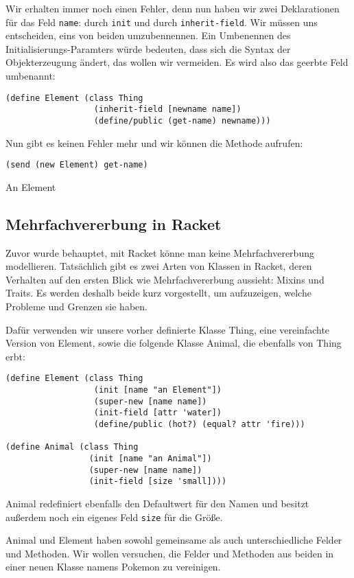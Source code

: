 Wir erhalten immer noch einen Fehler, denn nun haben wir zwei Deklarationen für das Feld \texttt{name}: durch \texttt{init} und durch \texttt{inherit-field}. Wir müssen uns entscheiden, eins von beiden umzubennennen. Ein Umbenennen des Initialisierungs-Paramters würde bedeuten, dass sich die Syntax der Objekterzeugung ändert, das wollen wir vermeiden. Es wird also das geerbte Feld umbenannt:

\begin{lstlisting}
(define Element (class Thing 
                  (inherit-field [newname name])
                  (define/public (get-name) newname)))
\end{lstlisting}

Nun gibt es keinen Fehler mehr und wir können die Methode aufrufen:

\begin{lstlisting}
(send (new Element) get-name)
\end{lstlisting}
{\routput {\qq}An Element\qq}

\subsection{Mehrfachvererbung in Racket}
\label{mixins}
Zuvor wurde behauptet, mit Racket könne man keine Mehrfachvererbung modellieren. Tatsächlich gibt es zwei Arten von Klassen in Racket, deren Verhalten auf den ersten Blick wie Mehrfachvererbung aussieht: Mixins und Traits. Es werden deshalb beide kurz vorgestellt, um aufzuzeigen, welche Probleme und Grenzen sie haben.

Dafür verwenden wir unsere vorher definierte Klasse Thing, eine vereinfachte Version von Element, sowie die folgende Klasse Animal, die ebenfalls von Thing erbt:

\begin{lstlisting}
(define Element (class Thing 
                  (init [name "an Element"])
                  (super-new [name name])
                  (init-field [attr 'water])
                  (define/public (hot?) (equal? attr 'fire)))

(define Animal (class Thing
                 (init [name "an Animal"])
                 (super-new [name name])
                 (init-field [size 'small])))
\end{lstlisting}

Animal redefiniert ebenfalls den Defaultwert für den Namen und besitzt außerdem noch ein eigenes Feld \texttt{size} für die Größe.

Animal und Element haben sowohl gemeinsame als auch unterschiedliche Felder und Methoden. Wir wollen versuchen, die Felder und Methoden aus beiden in einer neuen Klasse namens Pokemon zu vereinigen. 

